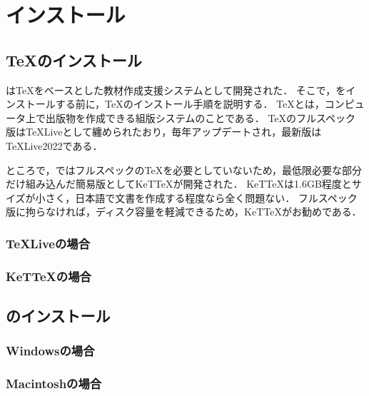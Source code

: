\addtocounter{page}{-1}

\chapter{インストール}

\section{{\TeX}のインストール}

{\ketcindy}は{\TeX}をベースとした教材作成支援システムとして開発された．
そこで，{\ketcindy}をインストールする前に，{\TeX}のインストール手順を説明する．
{\TeX}とは，コンピュータ上で出版物を作成できる組版システムのことである．
{\TeX}のフルスペック版は{\TeX}Liveとして纏められたおり，毎年アップデートされ，最新版は{\TeX}Live2022である．

ところで，{\ketcindy}ではフルスペックの{\TeX}を必要としていないため，最低限必要な部分だけ組み込んだ簡易版としてKeT{\TeX}が開発された．
KeT{\TeX}は1.6GB程度とサイズが小さく，日本語で文書を作成する程度なら全く問題ない．
フルスペック版に拘らなければ，ディスク容量を軽減できるため，KeT{\TeX}がお勧めである．

\subsection{{\TeX}Liveの場合}

\subsection{KeT{\TeX}の場合}

\section{{\ketcindy}のインストール}

\subsection{Windowsの場合}

\subsection{Macintoshの場合}

